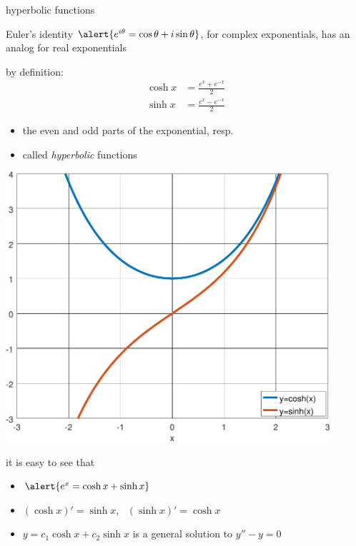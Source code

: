 \documentclass{beamer}
\begin{document}
\begin{frame}{hyperbolic functions}

\begin{itemize}
\item Euler's identity $\alert{e^{i\theta}=\cos\theta+i\sin\theta}$, for complex exponentials, has an analog for real exponentials

\noindent \begin{minipage}[t]{0.45\textwidth}
\item by definition:
\begin{align*}
\cosh x &= \frac{e^x + e^{-x}}{2} \\
\sinh x &= \frac{e^x - e^{-x}}{2}
\end{align*}

\vspace{-5mm}
    \begin{itemize}
    \item the even and odd parts of the exponential, resp.
    \item called \emph{hyperbolic} functions
    \end{itemize}
\end{minipage}
\begin{minipage}[t]{0.46\textwidth}
\vspace{5mm}

\hfill \includegraphics[width=0.9\textwidth]{figs/coshsinh}
\end{minipage}

\bigskip
\item it is easy to see that
    \begin{itemize}
    \item $\alert{e^x = \cosh x + \sinh x}$
    \item $(\cosh x)' = \sinh x$, \, $(\sinh x)' = \cosh x$
    \item $y=c_1 \cosh x + c_2 \sinh x$ is a general solution to $y''-y=0$
    \end{itemize}
\end{itemize}
\end{frame}
\end{document}
